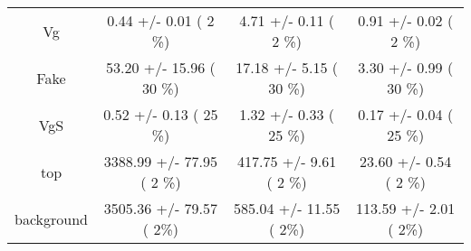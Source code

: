 \begin{table}[h!]
\begin{center}
{\begin{tabular}{
c| c | c | c | }
            Vg   &       0.44 +/-       0.01 (         2 \%)   &       4.71 +/-       0.11 (         2 \%)   &       0.91 +/-       0.02 (         2 \%)  \\
          Fake   &      53.20 +/-      15.96 (        30 \%)   &      17.18 +/-       5.15 (        30 \%)   &       3.30 +/-       0.99 (        30 \%)  \\
           VgS   &       0.52 +/-       0.13 (        25 \%)   &       1.32 +/-       0.33 (        25 \%)   &       0.17 +/-       0.04 (        25 \%)  \\
           top   &    3388.99 +/-      77.95 (         2 \%)   &     417.75 +/-       9.61 (         2 \%)   &      23.60 +/-       0.54 (         2 \%)  \\
\hline
    background   &    3505.36 +/-      79.57 (         2\%)   &     585.04 +/-      11.55 (         2\%)   &     113.59 +/-       2.01 (         2\%)  \\
\hline
\end{tabular}
}
\end{center}
\end{table}



